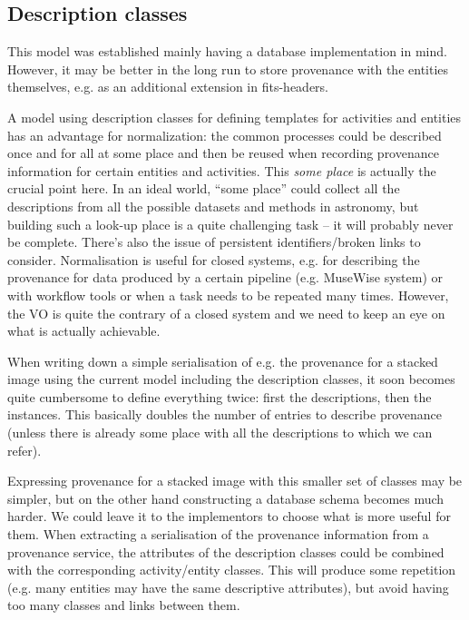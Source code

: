 \subsection{Description classes}
This model was established mainly having a database implementation in mind. 
However, it may be better in the long run to store provenance with 
the entities themselves, e.g. as an additional extension in fits-headers.

A model using description classes for defining templates for activities and
entities has an advantage for normalization: the common processes could be 
described once and for all at some place and then be reused when recording
provenance information for certain entities and activities. This \emph{some place} 
is actually the crucial point here.
In an ideal world, ``some place'' could collect all the descriptions from all 
the possible datasets and methods in astronomy, but building such a look-up place 
is a quite challenging task -- it will probably never be complete. There's also 
the issue of persistent identifiers/broken links to consider.
Normalisation is useful for closed systems, e.g. for describing the provenance 
for data produced by a certain pipeline (e.g. MuseWise system) or with 
workflow tools or when a task needs to be repeated many times. However, the VO 
is quite the contrary of a closed system and we need to keep an eye on what is 
actually achievable.

When writing down a simple serialisation of e.g. the provenance for a stacked 
image using the current model including the description classes, it soon becomes quite cumbersome to define 
everything twice: first the descriptions, then the instances. This basically 
doubles the number of entries to describe provenance (unless there is already 
some place with all the descriptions to which we can refer).

Expressing provenance for a stacked image with this smaller set of classes may 
be simpler, but on the other hand constructing a database schema becomes much 
harder. 
We could leave it to the implementors to choose what is more useful for them.
When extracting a serialisation of the provenance information from a provenance 
service, the attributes of the description classes could be combined with 
the corresponding activity/entity classes. This will produce some repetition
(e.g. many entities may have the same descriptive attributes), but 
avoid having too many classes and links between them.

